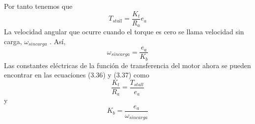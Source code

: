 Por tanto tenemos que
\begin{equation}
	T_{stall} = \frac{K_t}{R_a}e_a
\end{equation}
La velocidad angular que ocurre cuando el torque es cero se llama velocidad sin carga, $\omega_{sin carga}$ . Así,
\begin{equation}
	\omega_{sin carga} = \frac{e_a}{K_b}
\end{equation}
Las constantes eléctricas de la función de transferencia del motor ahora se pueden encontrar en las ecuaciones (3.36) y (3.37) como
\begin{equation}
	\frac{K_t}{R_a} = \frac{T_{stall}}{e_a}
\end{equation}
y 
\begin{equation}
	K_b = \frac{e_a}{\omega_{sincarga}}
\end{equation}